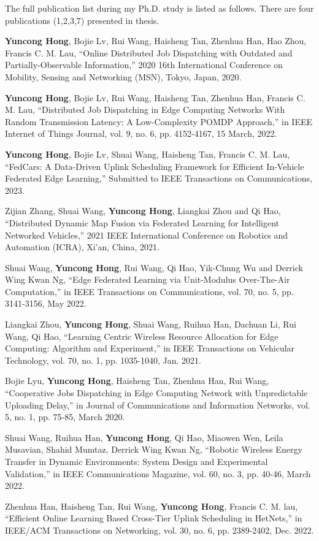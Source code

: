 
The full publication list during my Ph.D. study is listed as follows.
There are four publications (1,2,3,7) presented in thesis.

\cite{msn2020-hong} \textbf{Yuncong Hong}, Bojie Lv, Rui Wang, Haisheng Tan, Zhenhua Han, Hao Zhou, Francis C. M. Lau, ``Online Distributed Job Dispatching with Outdated and Partially-Observable Information,'' 2020 16th International Conference on Mobility, Sensing and Networking (MSN), Tokyo, Japan, 2020.

\cite{jiot2021-hong} \textbf{Yuncong Hong}, Bojie Lv, Rui Wang, Haisheng Tan, Zhenhua Han, Francis C. M. Lau, ``Distributed Job Dispatching in Edge Computing Networks With Random Transmission Latency: A Low-Complexity POMDP Approach,'' in IEEE Internet of Things Journal, vol. 9, no. 6, pp. 4152-4167, 15 March, 2022.

\cite{tcom2023-hong} \textbf{Yuncong Hong}, Bojie Lv, Shuai Wang, Haisheng Tan, Francis C. M. Lau, ``FedCars: A Data-Driven Uplink Scheduling Framework for Efficient In-Vehicle Federated Edge Learning,'' Submitted to IEEE Transactions on Communications, 2023.

\cite{icra2021-hong} Zijian Zhang, Shuai Wang, \textbf{Yuncong Hong}, Liangkai Zhou and Qi Hao, ``Distributed Dynamic Map Fusion via Federated Learning for Intelligent Networked Vehicles,'' 2021 IEEE International Conference on Robotics and Automation (ICRA), Xi'an, China, 2021.

\cite{tcom2022-hong} Shuai Wang, \textbf{Yuncong Hong}, Rui Wang, Qi Hao, Yik-Chung Wu and Derrick Wing Kwan Ng, ``Edge Federated Learning via Unit-Modulus Over-The-Air Computation,'' in IEEE Transactions on Communications, vol. 70, no. 5, pp. 3141-3156, May 2022.

\cite{tvt2020-hong} Liangkai Zhou, \textbf{Yuncong Hong}, Shuai Wang, Ruihua Han, Dachuan Li, Rui Wang, Qi Hao, ``Learning Centric Wireless Resource Allocation for Edge Computing: Algorithm and Experiment,'' in IEEE Transactions on Vehicular Technology, vol. 70, no. 1, pp. 1035-1040, Jan. 2021.

\cite{jcin2020-hong} Bojie Lyu, \textbf{Yuncong Hong}, Haisheng Tan, Zhenhua Han, Rui Wang, ``Cooperative Jobs Dispatching in Edge Computing Network with Unpredictable Uploading Delay,'' in Journal of Communications and Information Networks, vol. 5, no. 1, pp. 75-85, March 2020.

\cite{commag2022-hong} Shuai Wang, Ruihua Han, \textbf{Yuncong Hong}, Qi Hao, Miaowen Wen, Leila Musavian, Shahid Mumtaz, Derrick Wing Kwan Ng, ``Robotic Wireless Energy Transfer in Dynamic Environments: System Design and Experimental Validation,'' in IEEE Communications Magazine, vol. 60, no. 3, pp. 40-46, March 2022.

\cite{tnet2022-hong} Zhenhua Han, Haisheng Tan, Rui Wang, \textbf{Yuncong Hong}, Francis C. M. lau, ``Efficient Online Learning Based Cross-Tier Uplink Scheduling in HetNets,'' in IEEE/ACM Transactions on Networking, vol. 30, no. 6, pp. 2389-2402, Dec. 2022.
